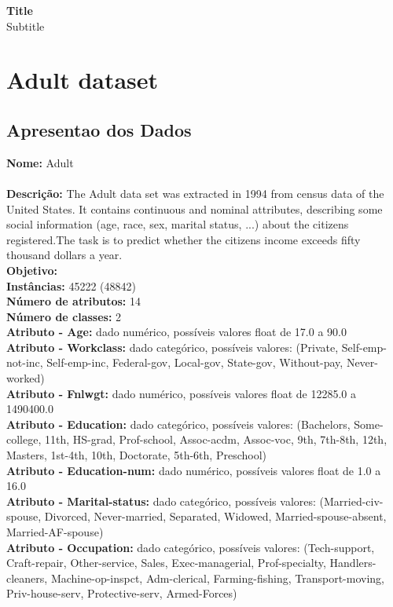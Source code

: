 \documentclass[12pt,a4paper]{article}
\begin{document}
\begin{center}
\textbf{Title}\\
Subtitle \\\vspace{36pt}
\end{center}
\section{Adult dataset}

\subsection{Apresentao dos Dados}

\textbf{Nome:} Adult\\ \\
\textbf{Descrição:} The Adult data set was extracted in 1994 from census data of the United States. It contains continuous and nominal attributes, describing some social information (age, race, sex, marital status, ...) about the citizens registered.The task is to predict whether the citizens income exceeds fifty thousand dollars a year.\\ 
\textbf{Objetivo:} \\ 
\textbf{Instâncias:} 45222 (48842)\\ 
\textbf{Número de atributos:} 14\\ 
\textbf{Número de classes:} 2\\ 
\textbf{Atributo - Age:} dado numérico, possíveis valores float de 17.0 a 90.0\\ 
\textbf{Atributo - Workclass:} dado categórico, possíveis valores: (Private, Self-emp-not-inc, Self-emp-inc, Federal-gov, Local-gov, State-gov, Without-pay, Never-worked)\\ 
\textbf{Atributo - Fnlwgt:} dado numérico, possíveis valores float de 12285.0 a 1490400.0\\ 
\textbf{Atributo - Education:} dado categórico, possíveis valores: (Bachelors, Some-college, 11th, HS-grad, Prof-school, Assoc-acdm, Assoc-voc, 9th, 7th-8th, 12th, Masters, 1st-4th, 10th, Doctorate, 5th-6th, Preschool)\\ 
\textbf{Atributo - Education-num:} dado numérico, possíveis valores float de 1.0 a 16.0\\ 
\textbf{Atributo - Marital-status:} dado categórico, possíveis valores: (Married-civ-spouse, Divorced, Never-married, Separated, Widowed, Married-spouse-absent, Married-AF-spouse)\\ 
\textbf{Atributo - Occupation:} dado categórico, possíveis valores: (Tech-support, Craft-repair, Other-service, Sales, Exec-managerial, Prof-specialty, Handlers-cleaners, Machine-op-inspct, Adm-clerical, Farming-fishing, Transport-moving, Priv-house-serv, Protective-serv, Armed-Forces)\\ 
\end{document}
